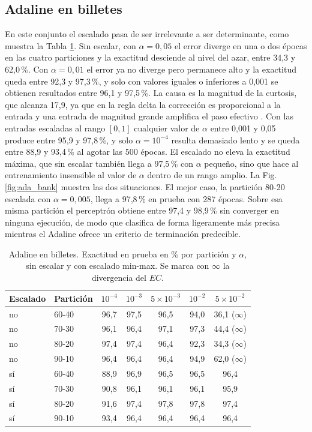 \documentclass[conference]{IEEEtran}
\begin{document}
\subsection{Adaline en billetes}

En este conjunto el escalado pasa de ser irrelevante a ser determinante, como muestra la Tabla \ref{tab:ada_bank}. Sin escalar, con $\alpha = 0{,}05$ el error diverge en una o dos \'epocas en las cuatro particiones y la exactitud desciende al nivel del azar, entre 34,3 y 62,0\,\%. Con $\alpha = 0{,}01$ el error ya no diverge pero permanece alto y la exactitud queda entre 92,3 y 97,3\,\%, y solo con valores iguales o inferiores a 0,001 se obtienen resultados entre 96,1 y 97,5\,\%. La causa es la magnitud de la curtosis, que alcanza 17,9, ya que en la regla delta la correcci\'on es proporcional a la entrada y una entrada de magnitud grande amplifica el paso efectivo \cite{lecun1998}. Con las entradas escaladas al rango $[0,1]$ cualquier valor de $\alpha$ entre 0,001 y 0,05 produce entre 95,9 y 97,8\,\%, y solo $\alpha = 10^{-4}$ resulta demasiado lento y se queda entre 88,9 y 93,4\,\% al agotar las 500 \'epocas. El escalado no eleva la exactitud m\'axima, que sin escalar tambi\'en llega a 97,5\,\% con $\alpha$ peque\~no, sino que hace al entrenamiento insensible al valor de $\alpha$ dentro de un rango amplio. La Fig. \ref{fig:ada_bank} muestra las dos situaciones. El mejor caso, la partici\'on 80-20 escalada con $\alpha = 0{,}005$, llega a 97,8\,\% en prueba con 287 \'epocas. Sobre esa misma partici\'on el perceptr\'on obtiene entre 97,4 y 98,9\,\% sin converger en ninguna ejecuci\'on, de modo que clasifica de forma ligeramente m\'as precisa mientras el Adaline ofrece un criterio de terminaci\'on predecible.

\begin{table}[!t]
\caption{Adaline en billetes. Exactitud en prueba en \% por partici\'on y $\alpha$, sin escalar y con escalado min-max. Se marca con $\infty$ la divergencia del $EC$.}
\label{tab:ada_bank}
\centering
\small
\begin{tabular}{@{}llccccc@{}}
\toprule
Escalado & Partici\'on & $10^{-4}$ & $10^{-3}$ & $5 \times 10^{-3}$ & $10^{-2}$ & $5 \times 10^{-2}$ \\
\midrule
no & 60-40 & 96,7 & 97,5 & 96,5 & 94,0 & 36,1 ($\infty$) \\
no & 70-30 & 96,1 & 96,4 & 97,1 & 97,3 & 44,4 ($\infty$) \\
no & 80-20 & 97,4 & 97,4 & 96,4 & 92,3 & 34,3 ($\infty$) \\
no & 90-10 & 96,4 & 96,4 & 96,4 & 94,9 & 62,0 ($\infty$) \\
s\'i & 60-40 & 88,9 & 96,9 & 96,5 & 96,5 & 96,4 \\
s\'i & 70-30 & 90,8 & 96,1 & 96,1 & 96,1 & 95,9 \\
s\'i & 80-20 & 91,6 & 97,4 & 97,8 & 97,8 & 97,4 \\
s\'i & 90-10 & 93,4 & 96,4 & 96,4 & 96,4 & 96,4 \\
\bottomrule
\end{tabular}
\end{table}
\end{document}
